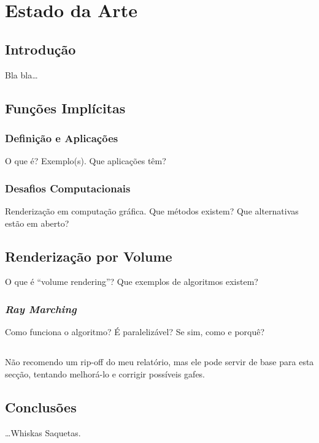 \chapter{Estado da Arte}
\label{ch::arte}

\section{Introdução}
\label{sec::arte:intro}

Bla bla\ldots


\section{Funções Implícitas}
\label{sec::arte:implicitas}

\subsection{Definição e Aplicações}
\label{ssec::arte:implicitas:def}

O que é? Exemplo(s). Que aplicações têm?

\subsection{Desafios Computacionais}
\label{ssec::arte:implicitas:desafios}

Renderização em computação gráfica. Que métodos existem? Que alternativas estão em aberto?


\section{Renderização por Volume}
\label{sec::arte:render}

O que é ``volume rendering''? Que exemplos de algoritmos existem?

\subsection{\emph{Ray Marching}}
\label{ssec::arte:render:raymarch}

Como funciona o algoritmo? É paralelizável? Se sim, como e porquê?


\section{\opengl}
\label{sec::arte:opengl}

Não recomendo um rip-off do meu relatório, mas ele pode servir de base para esta secção, tentando melhorá-lo e corrigir possíveis gafes.


\section{Conclusões}
\label{sec::arte:conc}

\ldots Whiskas Saquetas.
